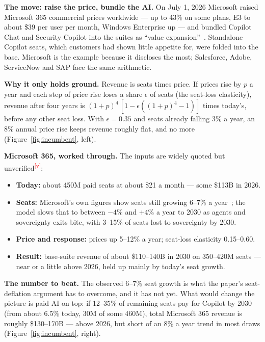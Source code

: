 \documentclass[11pt,letterpaper]{article}
\newcommand{\verify}{\textsuperscript{\textcolor{red}{[v]}}}
\newcommand{\lead}[1]{{\color{leadwarm}\sffamily\bfseries #1}}
\begin{document}
\lead{The move: raise the price, bundle the AI.} On July 1, 2026 Microsoft raised Microsoft 365 commercial prices worldwide --- up to 43\% on some plans, E3 to about \$39 per user per month, Windows Enterprise up --- and bundled Copilot Chat and Security Copilot into the suites as ``value expansion''~\cite{ref:m365_price_wl,ref:m365_price_uscloud,ref:m365_price_ow}. Standalone Copilot seats, which customers had shown little appetite for, were folded into the base. Microsoft is the example because it discloses the most; Salesforce, Adobe, ServiceNow and SAP face the same arithmetic.

\lead{Why it only holds ground.} Revenue is seats times price. If prices rise by $p$ a year and each step of price rise loses a share $\epsilon$ of seats (the seat-loss elasticity), revenue after four years is $(1+p)^4\,[1-\epsilon((1+p)^4-1)]$ times today's, before any other seat loss. With $\epsilon=0.35$ and seats already falling 3\% a year, an 8\% annual price rise keeps revenue roughly flat, and no more (Figure~\ref{fig:incumbent}, left).

\lead{Microsoft 365, worked through.} The inputs are widely quoted but unverified\verify:
\begin{itemize}
\item \textbf{Today:} about 450M paid seats at about \$21 a month --- some \$113B in 2026.
\item \textbf{Seats:} Microsoft's own figures show seats still growing 6--7\% a year~\cite{ref:msft_8k_fy27}; the model slows that to between $-4$\% and $+4$\% a year to 2030 as agents and sovereignty exits bite, with 3--15\% of seats lost to sovereignty by 2030.
\item \textbf{Price and response:} prices up 5--12\% a year; seat-loss elasticity 0.15--0.60.
\item \textbf{Result:} base-suite revenue of about \$110--140B in 2030 on 350--420M seats --- near or a little above 2026, held up mainly by today's seat growth.
\end{itemize}

\lead{The number to beat.} The observed 6--7\% seat growth is what the paper's seat-deflation argument has to overcome, and it has not yet. What would change the picture is paid AI on top: if 12--35\% of remaining seats pay for Copilot by 2030 (from about 6.5\% today, 30M of some 460M), total Microsoft 365 revenue is roughly \$130--170B --- above 2026, but short of an 8\% a year trend in most draws (Figure~\ref{fig:incumbent}, right).
\end{document}
